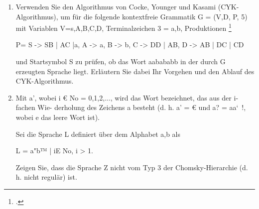 \documentclass{lehramt-informatik-aufgabe}
\begin{document}

\begin{enumerate}

\item Verwenden Sie den Algorithmus von Cocke, Younger und Kasami
(CYK-Algorithmus), um für die folgende kontextfreie Grammatik G = (V,D,
P, 5) mit Variablen V={s,A,B,C,D}, Terminalzeichen 3 = {a,b},
Produktionen
\footcite{examen:46115:2021:03}

P={
S -> SB | AC |a,
A -> a,
B -> b,
C -> DD | AB,
D -> AB | DC | CD
}

und Startsymbol S zu prüfen, ob das Wort aabababb in der durch G
erzeugten Sprache liegt. Erläutern Sie dabei Ihr Vorgehen und den Ablauf
des CYK-Algorithmus.


\item Mit a’, wobei i € No = {0,1,2,...}, wird das Wort bezeichnet, das
aus der i-fachen Wie- derholung des Zeichens a besteht (d. h. a’ = € und
a? = aa‘~!, wobei e das leere Wort ist).

Sei die Sprache L definiert über dem Alphabet {a,b} als

L = {a"b™ | iE No, i > 1}.

Zeigen Sie, dass die Sprache Z nicht vom Typ 3 der Chomsky-Hierarchie
(d. h. nicht regulär) ist.
\end{enumerate}
\end{document}
